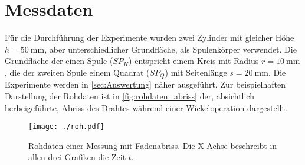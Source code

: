 \section{Messdaten}
\label{sec:Messdaten}

Für die Durchführung der Experimente wurden zwei Zylinder mit gleicher Höhe $h=50~\si{\milli\metre}$, aber unterschiedlicher Grundfläche, als Spulenkörper verwendet. Die Grundfläche der einen Spule ($SP_K$) entspricht einem Kreis mit Radius $r=10~\si{\milli\metre}$, die der zweiten Spule einem Quadrat ($SP_Q$) mit Seitenlänge $s=20~\si{\milli\metre}$. Die Experimente werden in \autoref{sec:Auswertung} näher ausgeführt. Zur beispielhaften Darstellung der Rohdaten ist in \autoref{fig:rohdaten_abriss} der, absichtlich herbeigeführte, Abriss des Drahtes während einer Wickeloperation dargestellt.

\begin{figure}[H]
    \centering
    \texttt{[image: ./roh.pdf]}
    \caption{Rohdaten einer Messung mit Fadenabriss. Die X-Achse beschreibt in allen drei Grafiken die Zeit $t$.}
    \label{fig:rohdaten_abriss}
\end{figure}
